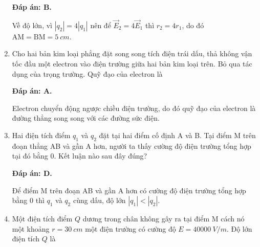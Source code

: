 \begin{enumerate}[label=\bfseries Câu \arabic*:]
{	}
	\loigiai
	{	\textbf{Đáp án: B.}
		
		Về độ lớn, vì $|q_2| = 4 |q_1|$ nên để $\vec E_2 = 4 \vec E_1$ thì $r_2 = 4r_1$, do đó $\text{AM} = \text{BM} = \SI{5}{cm}$.
	}
	\item {}
	
	\cauhoi
	{Cho hai bản kim loại phẳng đặt song song tích điện trái dấu, thả không vận tốc đầu một electron vào điện trường giữa hai bản kim loại trên. Bỏ qua tác dụng của trọng trường. Quỹ đạo của electron là
		
	}
	\loigiai
	{	\textbf{Đáp án: A.}
		
		Electron chuyển động ngược chiều điện trường, do đó quỹ đạo của electron là đường thẳng song song với các đường sức điện.
	}
	\item {}
	
	\cauhoi
	{Hai điện tích điểm $q_1$ và $q_2$ đặt tại hai điểm cố định A và B. Tại điểm M trên đoạn thẳng AB và gần A hơn, người ta thấy cường độ điện trường tổng hợp tại đó bằng 0. Kết luận nào sau đây đúng?
		
	}
	\loigiai
	{	\textbf{Đáp án: D.}
		
		Để điểm M trên đoạn AB và gần A hơn có cường độ điện trường tổng hợp bằng 0 thì $q_1$ và $q_2$ cùng dấu, độ lớn $|q_1| < |q_2|$.
	}
	\item {}
	
	\cauhoi
	{Một điện tích điểm $Q$ dương trong chân không gây ra tại điểm M cách nó một khoảng $r=\SI{30}{cm}$ một điện trường có cường độ $E=\SI{40000}{V/m}$. Độ lớn điện tích $Q$ là
		
}
\end{enumerate}
